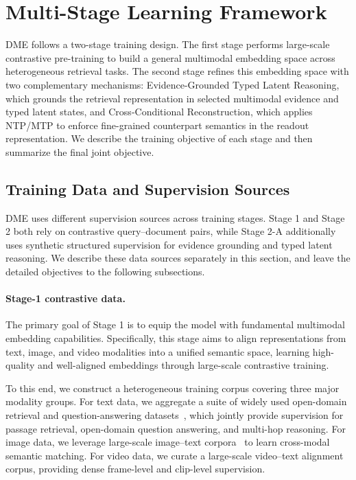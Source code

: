 \section{Multi-Stage Learning Framework}
\label{sec:multi-stage-learning-framework}

DME follows a two-stage training design. The first stage performs large-scale contrastive pre-training to build a general multimodal embedding space across heterogeneous retrieval tasks. The second stage refines this embedding space with two complementary mechanisms:
Evidence-Grounded Typed Latent Reasoning, which grounds the retrieval representation
in selected multimodal evidence and typed latent states, and Cross-Conditional
Reconstruction, which applies NTP/MTP to enforce fine-grained counterpart semantics
in the readout representation. We describe the training objective of each stage and then summarize the final joint objective.

\subsection{Training Data and Supervision Sources}
\label{sec:training-data-supervision}

DME uses different supervision sources across training stages. Stage 1 and Stage 2 both rely on contrastive query--document pairs, while Stage 2-A additionally uses synthetic structured supervision for evidence grounding and typed latent reasoning. We describe these data sources separately in this section, and leave the detailed objectives to the following subsections.

\paragraph{Stage-1 contrastive data.}

The primary goal of Stage 1 is to equip the model with fundamental multimodal embedding capabilities. Specifically, this stage aims to align representations from text, image, and video modalities into a unified semantic space, learning high-quality and well-aligned embeddings through large-scale contrastive training.

To this end, we construct a heterogeneous training corpus covering three major modality groups. For text data, we aggregate a suite of widely used open-domain retrieval and question-answering datasets~\cite{MS-MARCO,NQ,hotpotqa,triviaqa}, which jointly provide supervision for passage retrieval, open-domain question answering, and multi-hop reasoning. For image data, we leverage large-scale image–text corpora~\cite{CC12M,megapairs} to learn cross-modal semantic matching. For video data, we curate a large-scale video--text alignment corpus, providing dense frame-level and clip-level supervision.

